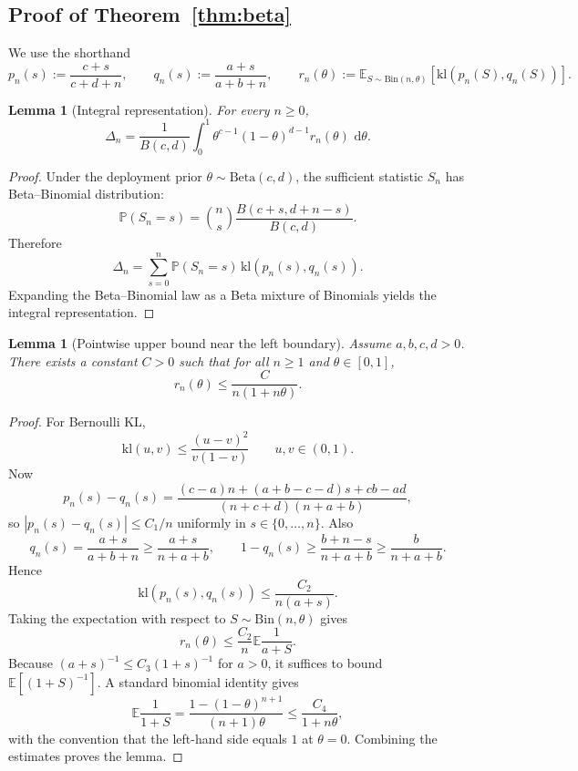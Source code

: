 \documentclass{article}
\newtheorem{lemma}[theorem]{Lemma}
\theoremstyle{definition}
\theoremstyle{remark}
\newcommand{\E}{\mathbb{E}}
\newcommand{\Pbb}{\mathbb{P}}
\newcommand{\BetaDist}{\mathrm{Beta}}
\newcommand{\Bin}{\mathrm{Bin}}
\newcommand{\klb}{\mathrm{kl}}
\newcommand{\dd}{\,\mathrm{d}}
\begin{document}
\subsection{Proof of Theorem~\ref{thm:beta}}
\label{app:beta-proofs}

We use the shorthand
\[
p_n(s) := \frac{c+s}{c+d+n},
\qquad
q_n(s) := \frac{a+s}{a+b+n},
\qquad
r_n(\theta) := \E_{S\sim \Bin(n,\theta)}[\klb(p_n(S),q_n(S))].
\]

\begin{lemma}[Integral representation]
\label{lem:beta-integral}
For every $n\ge 0$,
\[
\Delta_n
=
\frac{1}{B(c,d)}
\int_0^1
\theta^{c-1}(1-\theta)^{d-1}
r_n(\theta)\,\dd\theta.
\]
\end{lemma}

\begin{proof}
Under the deployment prior $\theta\sim \BetaDist(c,d)$, the sufficient statistic $S_n$ has Beta--Binomial distribution:
\[
\Pbb(S_n=s)
=
\binom{n}{s}
\frac{B(c+s,d+n-s)}{B(c,d)}.
\]
Therefore
\[
\Delta_n
=
\sum_{s=0}^n \Pbb(S_n=s)\,\klb(p_n(s),q_n(s)).
\]
Expanding the Beta--Binomial law as a Beta mixture of Binomials yields the integral representation.
\end{proof}

\begin{lemma}[Pointwise upper bound near the left boundary]
\label{lem:left-upper}
Assume $a,b,c,d>0$. There exists a constant $C>0$ such that for all $n\ge 1$ and $\theta\in[0,1]$,
\[
r_n(\theta) \le \frac{C}{n(1+n\theta)}.
\]
\end{lemma}

\begin{proof}
For Bernoulli KL,
\[
\klb(u,v) \le \frac{(u-v)^2}{v(1-v)}
\qquad
u,v\in(0,1).
\]
Now
\[
p_n(s)-q_n(s)
=
\frac{(c-a)n + (a+b-c-d)s + cb-ad}
{(n+c+d)(n+a+b)},
\]
so $|p_n(s)-q_n(s)|\le C_1/n$ uniformly in $s\in\{0,\dots,n\}$. Also
\[
q_n(s)=\frac{a+s}{a+b+n}\ge \frac{a+s}{n+a+b},
\qquad
1-q_n(s)\ge \frac{b+n-s}{n+a+b}\ge \frac{b}{n+a+b}.
\]
Hence
\[
\klb(p_n(s),q_n(s))
\le
\frac{C_2}{n(a+s)}.
\]
Taking the expectation with respect to $S\sim \Bin(n,\theta)$ gives
\[
r_n(\theta)\le \frac{C_2}{n}\E\frac{1}{a+S}.
\]
Because $(a+s)^{-1}\le C_3(1+s)^{-1}$ for $a>0$, it suffices to bound $\E[(1+S)^{-1}]$. A standard binomial identity gives
\[
\E\frac{1}{1+S}
=
\frac{1-(1-\theta)^{n+1}}{(n+1)\theta}
\le
\frac{C_4}{1+n\theta},
\]
with the convention that the left-hand side equals $1$ at $\theta=0$. Combining the estimates proves the lemma.
\end{proof}
\end{document}
